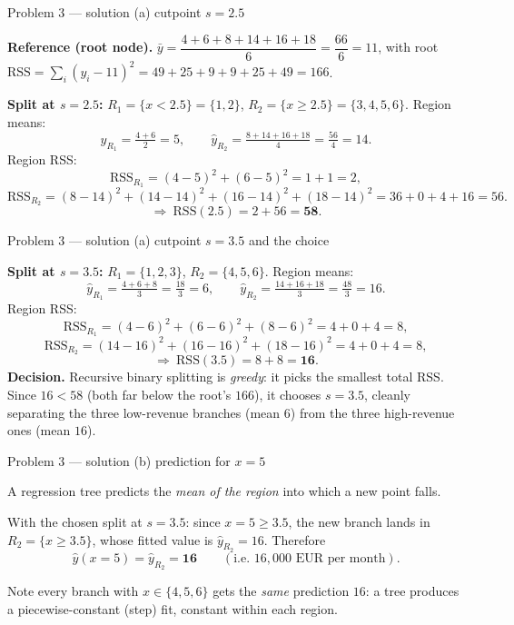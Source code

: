 \documentclass[aspectratio=169,11pt]{beamer}
\begin{document}
\begin{frame}{Problem 3 --- solution (a) cutpoint $s=2.5$}
  \begin{solutionbox}[Solution P3(a) --- part 1 of 2: evaluate {$s=2.5$}]
    \textbf{Reference (root node).} $\bar y=\dfrac{4+6+8+14+16+18}{6}=\dfrac{66}{6}=11$, with root
    $\mathrm{RSS}=\sum_i(y_i-11)^2=49{+}25{+}9{+}9{+}25{+}49=166$.
    \medskip

    \textbf{Split at $s=2.5$:} $R_1=\{x<2.5\}=\{1,2\}$, $R_2=\{x\ge2.5\}=\{3,4,5,6\}$.
    Region means:
    \[
      \hat y_{R_1}=\tfrac{4+6}{2}=5,\qquad
      \hat y_{R_2}=\tfrac{8+14+16+18}{4}=\tfrac{56}{4}=14 .
    \]
    Region RSS:
    \[
      \mathrm{RSS}_{R_1}=(4-5)^2+(6-5)^2=1+1=2,
    \]
    \[
      \mathrm{RSS}_{R_2}=(8{-}14)^2+(14{-}14)^2+(16{-}14)^2+(18{-}14)^2=36+0+4+16=56.
    \]
    \[
      \Rightarrow\ \mathrm{RSS}(2.5)=2+56=\mathbf{58}.
    \]
  \end{solutionbox}
\end{frame}

\begin{frame}{Problem 3 --- solution (a) cutpoint $s=3.5$ and the choice}
  \begin{solutionbox}[Solution P3(a) --- part 2 of 2: evaluate {$s=3.5$} and decide]
    \textbf{Split at $s=3.5$:} $R_1=\{1,2,3\}$, $R_2=\{4,5,6\}$. Region means:
    \[
      \hat y_{R_1}=\tfrac{4+6+8}{3}=\tfrac{18}{3}=6,\qquad
      \hat y_{R_2}=\tfrac{14+16+18}{3}=\tfrac{48}{3}=16 .
    \]
    Region RSS:
    \[
      \mathrm{RSS}_{R_1}=(4{-}6)^2+(6{-}6)^2+(8{-}6)^2=4+0+4=8,
    \]
    \[
      \mathrm{RSS}_{R_2}=(14{-}16)^2+(16{-}16)^2+(18{-}16)^2=4+0+4=8,
    \]
    \[
      \Rightarrow\ \mathrm{RSS}(3.5)=8+8=\mathbf{16}.
    \]
    \textbf{Decision.} Recursive binary splitting is \emph{greedy}: it picks the smallest total
    RSS. Since $16<58$ (both far below the root's $166$), it chooses $\boxed{s=3.5}$, cleanly
    separating the three low-revenue branches (mean $6$) from the three high-revenue ones (mean
    $16$).
  \end{solutionbox}
\end{frame}

\begin{frame}{Problem 3 --- solution (b) prediction for $x=5$}
  \begin{solutionbox}[Solution P3(b)]
    A regression tree predicts the \emph{mean of the region} into which a new point falls.
    \medskip

    With the chosen split at $s=3.5$: since $x=5\ge 3.5$, the new branch lands in
    $R_2=\{x\ge 3.5\}$, whose fitted value is $\hat y_{R_2}=16$. Therefore
    \[
      \hat y(x{=}5)=\hat y_{R_2}=\mathbf{16}\qquad(\text{i.e.\ }16{,}000\text{ EUR per month}).
    \]
    \medskip

    Note every branch with $x\in\{4,5,6\}$ gets the \emph{same} prediction $16$: a tree produces
    a piecewise-constant (step) fit, constant within each region.
  \end{solutionbox}
\end{frame}
\end{document}
